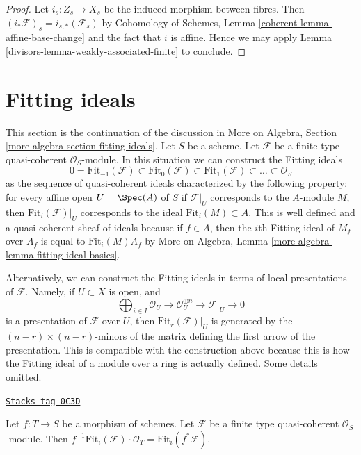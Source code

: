 \begin{proof}

Let $i_s : Z_s \to X_s$ be the induced morphism between fibres.
Then $(i_*\mathcal{F})_s = i_{s, *}(\mathcal{F}_s)$ by
Cohomology of Schemes, Lemma \ref{coherent-lemma-affine-base-change}
and the fact that $i$ is affine. Hence
we may apply Lemma \ref{divisors-lemma-weakly-associated-finite} to conclude.
\end{proof}

\section{Fitting ideals}
\label{divisors-section-fitting-ideals}
This section is the continuation of the discussion in
More on Algebra, Section \ref{more-algebra-section-fitting-ideals}.
Let $S$ be a scheme. Let $\mathcal{F}$ be a
finite type quasi-coherent $\mathcal{O}_S$-module.
In this situation we can construct the Fitting ideals
$$
0 = \text{Fit}_{-1}(\mathcal{F}) \subset \text{Fit}_0(\mathcal{F}) \subset
\text{Fit}_1(\mathcal{F}) \subset \ldots \subset \mathcal{O}_S
$$
as the sequence of quasi-coherent ideals characterized by the following
property: for every affine open $U = \Spec(A)$ of $S$ if $\mathcal{F}|_U$
corresponds to the $A$-module $M$, then $\text{Fit}_i(\mathcal{F})|_U$
corresponds to the ideal $\text{Fit}_i(M) \subset A$.
This is well defined and a quasi-coherent sheaf of ideals because
if $f \in A$, then the $i$th Fitting ideal of $M_f$ over $A_f$
is equal to $\text{Fit}_i(M) A_f$ by
More on Algebra, Lemma \ref{more-algebra-lemma-fitting-ideal-basics}.

\medskip\noindent
Alternatively, we can construct the Fitting ideals in terms of local
presentations of $\mathcal{F}$. Namely, if $U \subset X$ is open, and
$$
\bigoplus\nolimits_{i \in I} \mathcal{O}_U \to
\mathcal{O}_U^{\oplus n} \to \mathcal{F}|_U \to 0
$$
is a presentation of $\mathcal{F}$ over $U$, then
$\text{Fit}_r(\mathcal{F})|_U$ is generated by the
$(n - r) \times (n - r)$-minors
of the matrix defining the first arrow of the presentation.
This is compatible with the construction above because this
is how the Fitting ideal of a module over a ring is actually defined.
Some details omitted.

\begin{lemma}
\label{divisors-lemma-base-change-fitting-ideal}
\href{https://stacks.math.columbia.edu/tag/0C3D}{\texttt{Stacks tag 0C3D}}

Let $f : T \to S$ be a morphism of schemes.
Let $\mathcal{F}$ be a finite type quasi-coherent $\mathcal{O}_S$-module.
Then
$f^{-1}\text{Fit}_i(\mathcal{F}) \cdot \mathcal{O}_T =
\text{Fit}_i(f^*\mathcal{F})$.
\end{lemma}

